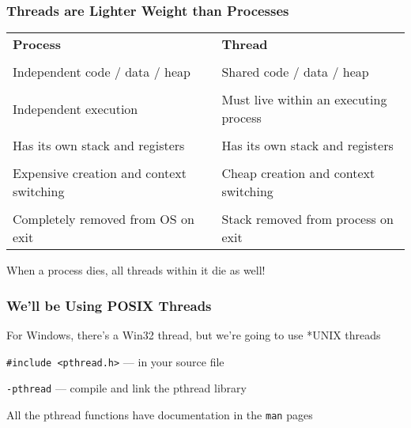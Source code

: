   \begin{frame}
    \frametitle{Threads are Lighter Weight than Processes}

    \begin{tabular}{ll}
      \textbf{Process} & \textbf{Thread} \\
      \\
      Independent code / data / heap & Shared code / data / heap \\
      \\
      Independent execution & Must live within an executing process \\
      \\
      Has its own stack and registers & Has its own stack and registers \\
      \\
      Expensive creation and context switching & Cheap creation and context switching \\
      \\
      Completely removed from OS on exit & Stack removed from process on exit \\
    \end{tabular}

    \vspace{2em}

    When a process dies, all threads within it die as well!
  \end{frame}

  \begin{frame}[fragile]
    \frametitle{We'll be Using POSIX Threads}

    For Windows, there's a Win32 thread, but we're going to use *UNIX threads

    \vspace{2em}

    \lstinline|#include <pthread.h>| --- in your source file

    \vspace{2em}

    \lstinline|-pthread| --- compile and link the pthread library

    \vspace{2em}

    All the pthread functions have documentation in the \lstinline|man| pages
  \end{frame}

